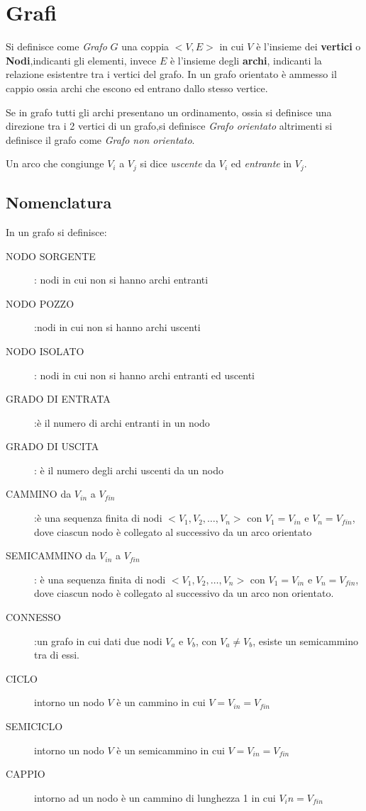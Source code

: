\section{Grafi}
Si definisce come \emph{Grafo} $G$ una coppia $<V,E>$ in cui $V$ è l'insieme
dei \textbf{vertici} o \textbf{Nodi},indicanti gli elementi, invece $E$
 è l'insieme degli \textbf{archi}, indicanti la relazione esistentre tra i vertici del grafo.\newline
In un grafo orientato è ammesso il cappio ossia archi che escono ed entrano dallo stesso vertice.

Se in grafo tutti gli archi presentano un ordinamento, ossia si definisce una direzione
tra i 2 vertici di un grafo,si definisce \emph{Grafo orientato}
altrimenti si definisce il grafo come \emph{Grafo non orientato}.

Un arco che congiunge $V_i$ a $V_j$ si dice \emph{uscente} da $V_i$ ed \emph{entrante} in $V_j$.

\subsection{Nomenclatura}
In un grafo si definisce:
\begin{description}
    \item[NODO SORGENTE]: nodi in cui non si hanno archi entranti
    \item[NODO POZZO]:nodi in cui non si hanno archi uscenti
    \item[NODO ISOLATO]: nodi in cui non si hanno archi entranti ed uscenti
    \item[GRADO DI ENTRATA]:è il numero di archi entranti in un nodo
    \item[GRADO DI USCITA]: è il numero degli archi uscenti da un nodo
    \item[CAMMINO da $V_{in}$ a $V_{fin}$]:è una sequenza finita di nodi $<V_1,V_2,\dots,V_n>$
     con $V_1 = V_{in}$ e $V_n = V_{fin}$, dove ciascun nodo è collegato al successivo da un arco orientato
    \item[SEMICAMMINO da $V_{in}$ a $V_{fin}$]: è una sequenza finita di nodi
     $<V_1,V_2,\dots,V_n>$ con $V_1 = V_{in}$ e $V_n = V_{fin}$, dove ciascun nodo
     è collegato al successivo da un arco non orientato.
    \item[CONNESSO]:un grafo in cui dati due nodi $V_a$ e $V_b$, con $V_a \neq V_b$,
                    esiste un semicammino tra di essi.
    \item[CICLO]intorno un nodo $V$ è un cammino in cui $V = V_{in} = V_{fin}$
    \item[SEMICICLO]intorno un nodo $V$ è un semicammino in cui $V = V_{in} = V_{fin}$
    \item[CAPPIO]intorno ad un nodo è un cammino di lunghezza 1 in cui $V_in = V_{fin}$
\end{description}




